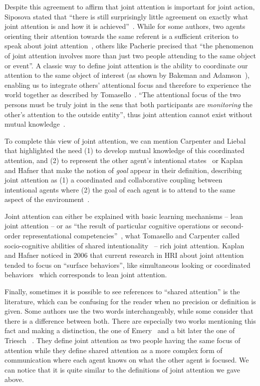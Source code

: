 \documentclass[a4paper,11pt,twoside]{StyleThese}
\begin{document}
Despite this agreement to affirm that joint attention is important for joint action, Siposova stated that ``there is still surprisingly little agreement on exactly what joint attention is and how it is achieved''~\cite{siposova_2019_new}. While for some authors, two agents orienting their attention towards the same referent is a sufficient criterion to speak about joint attention~\cite{butterworth_1991_minds}, others like Pacherie precised that ``the phenomenon of joint attention involves more than just two people attending to the same object or event''. A classic way to define joint attention is the ability to coordinate our attention to the same object of interest (\eg as shown by Bakeman and Adamson~\cite{bakeman_1984_coordinating}), enabling us to integrate others’ attentional focus and therefore to experience the world together as described by Tomasello~\cite{tomasello_2009_cultural}.  ``The attentional focus of the two persons must be truly joint in the sens that both participants are \textit{monitoring} the other's attention to the outside entity'', thus joint attention cannot exist without mutual knowledge~\cite[p.~106]{tomasello_1995_joint}.

To complete this view of joint attention, we can mention Carpenter and Liebal that highlighted the need (1) to develop mutual knowledge of this coordinated attention, and (2) to represent the other agent’s intentional states~\cite{carpenter_2011_joint} or Kaplan and Hafner that make the notion of \textit{goal} appear in their definition, describing joint attention as (1) a coordinated and collaborative coupling between intentional agents where (2) the goal of each agent is to attend to the same aspect of the environment~\cite{kaplan_2006_challenges}.

Joint attention can either be explained with basic learning mechanisms -- lean joint attention -- or as ``the result of particular cognitive operations or second-order representational competencies''~\cite{racine_2011_getting}, \ie what Tomasello and Carpenter called socio-cognitive abilities of shared intentionality~\cite{tomasello_2007_shared} -- rich joint attention. Kaplan and Hafner noticed in 2006 that current research in HRI about joint attention tended to focus on ``surface behaviors'', like simultaneous looking or coordinated behaviors~\cite{kaplan_2006_challenges} which corresponds to lean joint attention.

Finally, sometimes it is possible to see references to ``shared attention'' is the literature, which can be confusing for the reader when no precision or definition is given. Some authors use the two words interchangeably, while some consider that there is a difference between both. There are especially two works mentioning this fact and making a distinction, the one of Emery~\cite{emery_2000_eyes} and a bit later the one of Triesch \etal~\cite{triesch_2006_gaze}. They define joint attention as two people having the same focus of attention while they define shared attention as a more complex form of communication where each agent knows on what the other agent is focused. We can notice that it is quite similar to the definitions of joint attention we gave above.
\end{document}

